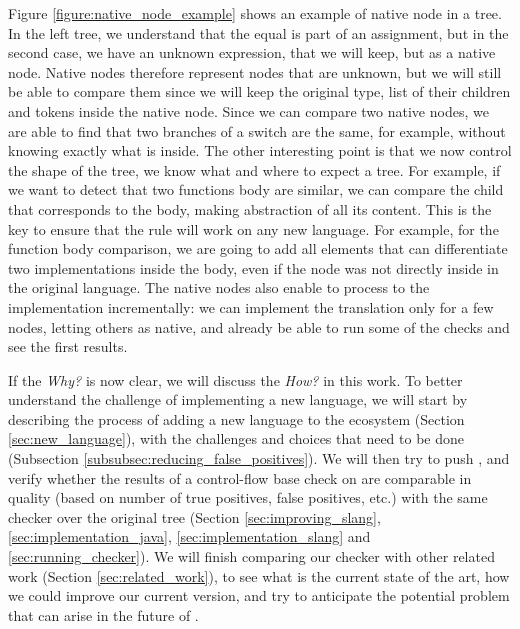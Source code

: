 Figure \ref{figure:native_node_example} shows an example of native node in a \slang{} tree. In the left tree, we understand that the equal is part of an assignment, but in the second case, we have an unknown expression, that we will keep, but as a native node.
Native nodes therefore represent nodes that are unknown, but we will still be able to compare them since we will keep the original type, list of their children and tokens inside the native node. 
Since we can compare two native nodes, we are able to find that two branches of a switch are the same, for example, without knowing exactly what is inside.
The other interesting point is that we now control the shape of the tree, we know what and where to expect a tree. 
For example, if we want to detect that two functions body are similar, we can compare the child that corresponds to the body, making abstraction of all its content.
This is the key to ensure that the rule will work on any new language.
For example, for the function body comparison, we are going to add all elements that can differentiate two implementations inside the body, even if the node was not directly inside in the original language.
The native nodes also enable to process to the implementation incrementally: we can implement the translation only for a few nodes, letting others as native, and already be able to run some of the checks and see the first results.


If the \emph{Why?} is now clear, we will discuss the \emph{How?} in this work. 
To better understand the challenge of implementing a new language, we will start by describing the process of adding a new language to the ecosystem (Section \ref{sec:new_language}), with the challenges and choices that need to be done (Subsection \ref{subsubsec:reducing_false_positives}). 
We will then try to push \slang{}, and verify whether the results of a control-flow base check on \slang{} are comparable in quality (based on number of true positives, false positives, etc.) with the same checker over the original tree (Section \ref{sec:improving_slang}, \ref{sec:implementation_java}, \ref{sec:implementation_slang} and \ref{sec:running_checker}).
We will finish comparing our checker with other related work (Section \ref{sec:related_work}), to see what is the current state of the art, how we could improve our current version, and try to anticipate the potential problem that can arise in the future of \slang{}.




